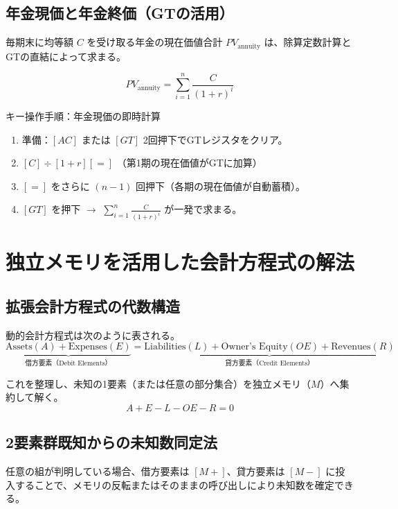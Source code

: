 \section{年金現価と年金終価（GTの活用）}
毎期末に均等額 $C$ を受け取る年金の現在価値合計 $PV_{\text{annuity}}$ は、除算定数計算とGTの直結によって求まる。

\begin{equation}
    PV_{\text{annuity}} = \sum_{i=1}^n \frac{C}{(1+r)^i}
\end{equation}

\begin{calcbox}{キー操作手順：年金現価の即時計算}
\begin{enumerate}
    \item 準備：$[AC]$ または $[GT]$ 2回押下でGTレジスタをクリア。
    \item $[C] \div [1 + r] [=]$ （第1期の現在価値がGTに加算）
    \item $[=]$ をさらに $(n-1)$ 回押下（各期の現在価値が自動蓄積）。
    \item $[GT]$ を押下 $\to$ $\sum_{i=1}^n \frac{C}{(1+r)^i}$ が一発で求まる。
\end{enumerate}
\end{calcbox}

\chapter{独立メモリを活用した会計方程式の解法}

\section{拡張会計方程式の代数構造}
動的会計方程式は次のように表される。
\begin{equation}
    \underbrace{\text{Assets} (A) + \text{Expenses} (E)}_{\text{借方要素（Debit Elements）}} = \underbrace{\text{Liabilities} (L) + \text{Owner's Equity} (OE) + \text{Revenues} (R)}_{\text{貸方要素（Credit Elements）}}
\end{equation}

これを整理し、未知の1要素（または任意の部分集合）を独立メモリ（$M$）へ集約して解く。
\begin{equation}
    A + E - L - OE - R = 0
\end{equation}

\section{2要素群既知からの未知数同定法}
任意の組が判明している場合、借方要素は $[M+]$、貸方要素は $[M-]$ に投入することで、メモリの反転またはそのままの呼び出しにより未知数を確定できる。

